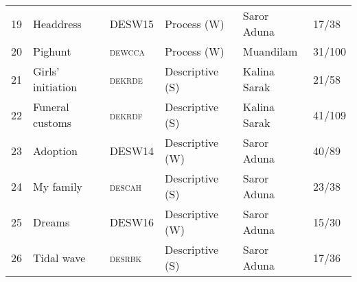 \begin{tabular}{llllll}
19 & Headdress  & DESW15 & Process (W) & Saror Aduna  & 17/38 \\
20 & Pighunt  & \textsc{dewcca} & Process (W) & Muandilam  & 31/100 \\
21 & Girls' initiation  & \textsc{dekrde} & Descriptive (S) & Kalina Sarak  & 21/58 \\
22 & Funeral customs  & \textsc{dekrdf} & Descriptive (S) & Kalina Sarak  & 41/109 \\
23 & Adoption  & DESW14 & Descriptive (W) & Saror Aduna  & 40/89 \\
24 & My family  & \textsc{descah} & Descriptive (S) & Saror Aduna  & 23/38 \\
25 & Dreams  & DESW16 & Descriptive (W) & Saror Aduna  & 15/30 \\
26 & Tidal wave  & \textsc{desrbk} & Descriptive (S) & Saror Aduna  & 17/36 \\
\end{tabular}
